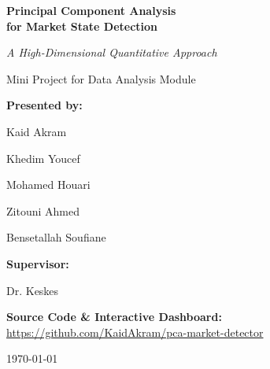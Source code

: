 \documentclass[12pt,twoside]{report}
\begin{document}
\begin{titlepage}
    \begin{center}
        \vspace*{2cm}
        
        {\Huge \textbf{\color{deepblue}Principal Component Analysis\\for Market State Detection}}\vspace{1cm}
        
        {\Large \textit{A High-Dimensional Quantitative Approach}}\vspace{0.5cm}
        
        {\large Mini Project for Data Analysis Module}\vspace{2cm}
        
        \begin{tcolorbox}[colback=codebg,colframe=deepblue,width=0.7\textwidth,arc=4mm,boxrule=1.5pt,shadow={2mm}{-2mm}{0mm}{black!30}]
            \centering
            \vspace{0.5cm}
            \textbf{\Large Presented by:}\vspace{0.3cm}
            
            {\large Kaid Akram}\vspace{0.1cm}
            
            {\large Khedim Youcef}\vspace{0.1cm}
            
            {\large Mohamed Houari}\vspace{0.1cm}
            
            {\large Zitouni Ahmed}\vspace{0.1cm}
            
            {\large Bensetallah Soufiane}\vspace{0.5cm}
            
            \textbf{\Large Supervisor:}\vspace{0.1cm}
            
            {\large Dr. Keskes}
            \vspace{0.5cm}
        \end{tcolorbox}
        
        \vfill
        
        \textbf{Source Code \& Interactive Dashboard:}\\
        \url{https://github.com/KaidAkram/pca-market-detector}
        
        \vspace{0.8cm}
        {\large \today}
        
    \end{center}
\end{titlepage}
\end{document}
